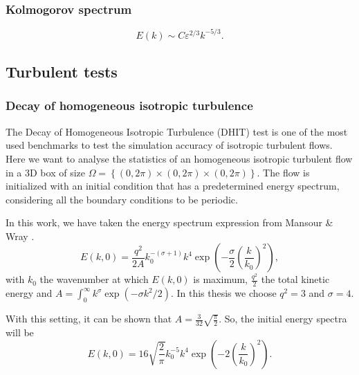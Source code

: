 \subsubsection{Kolmogorov spectrum}
\label{subsubsec-Kolmogorov_spectrum}
\begin{equation}
\label{eq-kolmogorov_spectrum}
E(k)\sim C\varepsilon^{2/3}k^{-5/3}.
\end{equation}

\subsection{Turbulent tests}
\label{subsec-isotropic_tests}

\subsubsection{Decay of homogeneous isotropic turbulence}
The Decay of Homogeneous Isotropic Turbulence (DHIT) test is one of the most used benchmarks to test the simulation accuracy of isotropic turbulent flows. Here we want to analyse the statistics of an homogeneous isotropic turbulent flow in a 3D box of size $\Omega=\left\{(0,2\pi)\times(0,2\pi)\times(0,2\pi)\right\}$. The flow is initialized with an initial condition that has a predetermined energy spectrum, considering all the boundary conditions to be periodic.

In this work, we have taken the energy spectrum expression from Mansour \& Wray \cite{mansour_decay_1994}.
\begin{equation}
\label{eq-DHIT_init_spectrum}
E(k,0)=\frac{q^2}{2A}k_0^{-(\sigma+1)}k^4\exp\left(-\frac{\sigma}{2}\left(\frac{k}{k_0}\right)^2\right),
\end{equation}
with $k_0$ the wavenumber at which $E(k,0)$ is maximum, $\frac{q^2}{2}                                                                                                                                                                                                                  $ the total kinetic energy and $A=\int_0^\infty k^\sigma\exp(-\sigma k^2/2)$. In this thesis we choose $q^2=3$ and $\sigma=4$.

With this setting, it can be shown that $A=\frac{3}{32}\sqrt{\frac{\pi}{2}}$. So, the initial energy spectra will be
\begin{equation}
\label{eq-DHIT_init_spectrum2}
E(k,0)=16\sqrt{\frac{2}{\pi}}k_0^{-5}k^4\exp\left(-2\left(\frac{k}{k_0}\right)^2\right).
\end{equation}

